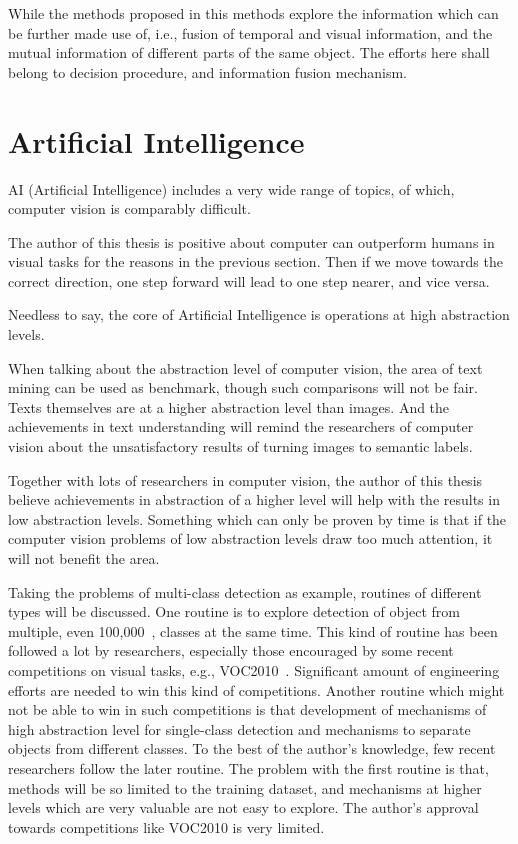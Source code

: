 While the methods proposed in this methods explore the information which can be further made use of, i.e., fusion of temporal and visual information, and the mutual information of different parts of the same object. The efforts here shall belong to decision procedure, and information fusion mechanism.

\section{Artificial Intelligence}
AI (Artificial Intelligence) includes a very wide range of topics, of which, computer vision is comparably difficult.

The author of this thesis is positive about computer can outperform humans in visual tasks for the reasons in the previous section. Then if we move towards the correct direction, one step forward will lead to one step nearer, and vice versa.

Needless to say, the core of Artificial Intelligence is operations at high abstraction levels.

When talking about the abstraction level of computer vision, the area of text mining can be used as benchmark, though such comparisons will not be fair. Texts themselves are at a higher abstraction level than images. And the achievements in text understanding will remind the researchers of computer vision about the unsatisfactory results of turning images to semantic labels.

Together with lots of researchers in computer vision, the author of this thesis believe achievements in abstraction of a higher level will help with the results in low abstraction levels. Something which can only be proven by time is that if the computer vision problems of low abstraction levels draw too much attention, it will not benefit the area.


Taking the problems of multi-class detection as example, routines of different types will be discussed. One routine is to explore detection of object from multiple, even 100,000~\cite{408}, classes at the same time. This kind of routine has been followed a lot by researchers, especially those encouraged by some recent competitions on visual tasks, e.g., VOC2010~\cite{voc}. Significant amount of engineering efforts are needed to win this kind of competitions. Another routine which might not be able to win in such competitions is that
development of mechanisms of high abstraction level for single-class detection and mechanisms to separate objects from different classes. To the best of the author's knowledge, few recent researchers follow the later routine. The problem with the first routine is that, methods will be so limited to the training dataset, and mechanisms at higher levels which are very valuable are not easy to explore. The author's approval towards competitions like VOC2010 is very limited.

